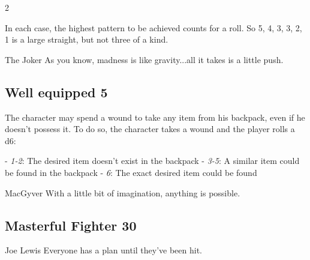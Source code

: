 \begin{multicols}{2}
\begin{tcolorbox}
In each case, the highest pattern to be achieved counts for a roll. So 5, 4, 3, 3, 2, 1 is a large straight, but not three of a kind.

\begin{pquote}{The Joker}
As you know, madness is like gravity...all it takes is a little push.
\end{pquote}

\vspace{3mm}



\end{tcolorbox}

\begin{tcolorbox}
    \subsection*{Well equipped \hfill \small{5 }}
    \tcblower
The character may spend a wound to take any item from his backpack, even if he doesn't possess it. To do so, the character takes a wound and the player rolls a d6:

- \textit{1-2}: The desired item doesn't exist in the backpack
- \textit{3-5}: A similar item could be found in the backpack
- \textit{6}: The exact desired item could be found

\begin{pquote}{MacGyver}
With a little bit of imagination, anything is possible.
\end{pquote}

\vspace{3mm}



\end{tcolorbox}

\begin{tcolorbox}
    \subsection*{Masterful Fighter \hfill \small{30 }}
    \tcblower


\begin{pquote}{Joe Lewis}
Everyone has a plan until they’ve been hit.
\end{pquote}


\end{tcolorbox}
\end{multicols}
